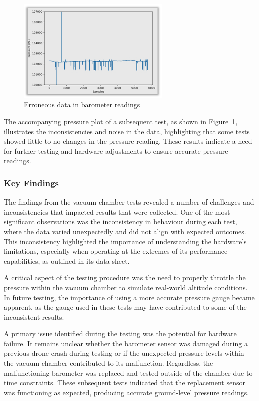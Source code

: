 \begin{figure}[h]
    \begin{center}
        \includegraphics[width=0.65\textwidth]{./img/barometer_spikes.png}
    \end{center}
    \caption{Erroneous data in barometer readings}\label{fig:barometer_spikes}
\end{figure}

The accompanying pressure plot of a subsequent test, as shown in Figure~\ref{fig:barometer_spikes}, illustrates the inconsistencies and noise in the data, highlighting that some tests showed little to no changes in the pressure reading. These results indicate a need for further testing and hardware adjustments to ensure accurate pressure readings.

\subsubsection{Key Findings}
The findings from the vacuum chamber tests revealed a number of challenges and inconsistencies that impacted results that were collected. One of the most significant observations was the inconsistency in behaviour during each test, where the data varied unexpectedly and did not align with expected outcomes. This inconsistency highlighted the importance of understanding the hardware's limitations, especially when operating at the extremes of its performance capabilities, as outlined in its data sheet. 

A critical aspect of the testing procedure was the need to properly throttle the pressure within the vacuum chamber to simulate real-world altitude conditions. In future testing, the importance of using a more accurate pressure gauge became apparent, as the gauge used in these tests may have contributed to some of the inconsistent results. 

A primary issue identified during the testing was the potential for hardware failure. It remains unclear whether the barometer sensor was damaged during a previous drone crash during testing or if the unexpected pressure levels within the vacuum chamber contributed to its malfunction. Regardless, the malfunctioning barometer was replaced and tested outside of the chamber due to time constraints. These subsequent tests indicated that the replacement sensor was functioning as expected, producing accurate ground-level pressure readings. 

